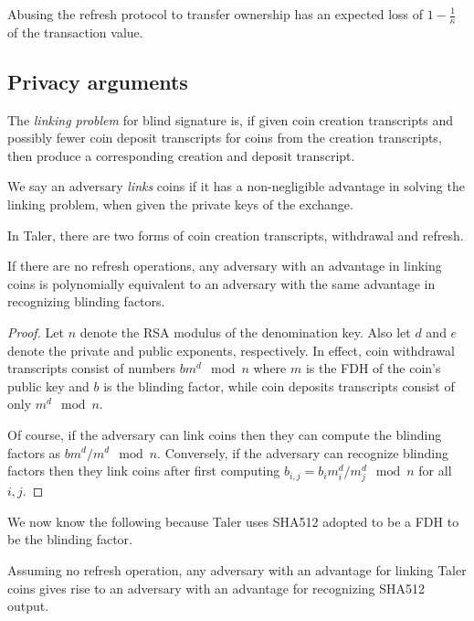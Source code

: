 \documentclass[sigconf, authordraft]{acmart}
\begin{document}
\begin{corollary}
  Abusing the refresh protocol to transfer ownership has an
  expected loss of $1 - \frac{1}{\kappa}$ of the transaction value.
\end{corollary}


\subsection{Privacy arguments}

The {\em linking problem} for blind signature is,
if given coin creation transcripts and possibly fewer
coin deposit transcripts for coins from the creation transcripts,
then produce a corresponding creation and deposit transcript.

We say an adversary {\em links} coins if it has a non-negligible
advantage in solving the linking problem, when given the private
keys of the exchange.

In Taler, there are two forms of coin creation transcripts,
withdrawal and refresh.

\begin{lemma}
If there are no refresh operations, any adversary with an
advantage in linking coins is polynomially equivalent to an
adversary with the same advantage in recognizing blinding factors.
\end{lemma}

\begin{proof}
Let $n$ denote the RSA modulus of the denomination key.
Also let $d$ and $e$ denote the private and public exponents, respectively.
In effect, coin withdrawal transcripts consist of numbers
$b m^d \mod n$ where $m$ is the FDH of the coin's public key
and $b$ is the blinding factor, while coin deposits transcripts
consist of only $m^d \mod n$.

Of course, if the adversary can link coins then they can compute
the blinding factors as $b m^d / m^d \mod n$.  Conversely, if the
adversary can recognize blinding factors then they link coins after
first computing $b_{i,j} = b_i m_i^d / m_j^d \mod n$ for all $i,j$.
\end{proof}

We now know the following because Taler uses SHA512 adopted to be
 a FDH to be the blinding factor.

\begin{corollary}
Assuming no refresh operation,
any adversary with an advantage for linking Taler coins gives
rise to an adversary with an advantage for recognizing SHA512 output.
\end{corollary}
\end{document}
